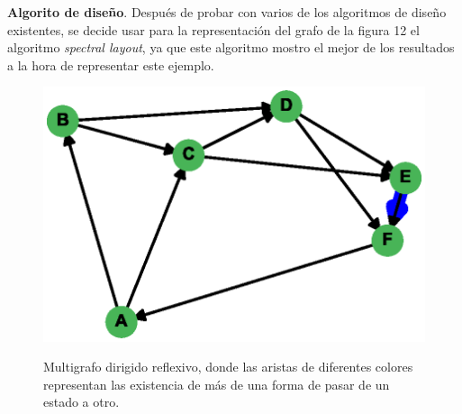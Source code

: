 \documentclass{article}
\begin{document}
\textbf{Algorito de diseño}.
Después de probar con varios de los algoritmos de diseño existentes, se decide usar para la representación del grafo de la figura 12 el algoritmo \textit{spectral layout}, ya que este algoritmo mostro el mejor de los resultados a la hora de representar este ejemplo.
\begin{center}

\end{center}
\begin{figure}[h]
\begin{center}
\includegraphics[scale=0.7]{Graf12_spectral_layout.eps}\\
\caption{Multigrafo dirigido reflexivo, donde las aristas de diferentes colores representan las existencia de más de una forma de pasar de un estado a otro.}
\end{center}
\end{figure}
\newpage



\end{document}
